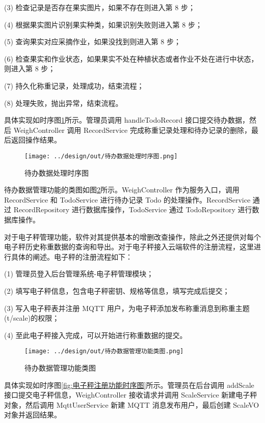 (3) 检查记录是否存在果实图片，如果不存在则进入第 8 步；

(4) 根据果实图片识别果实种类，如果识别失败则进入第 8 步；

(5) 查询果实对应采摘作业，如果没找到则进入第 8 步；

(6) 检查果实和作业状态，如果果实不处在种植状态或者作业不处在进行中状态，则进入第 8 步；

(7) 持久化称重记录，处理成功，结束流程；

(8) 处理失败，抛出异常，结束流程。

具体实现如时序图\ref{fig:待办数据处理时序图}所示。管理员调用 handleTodoRecord 接口提交待办数据，然后 WeighController 调用 RecordService 完成称重记录处理和待办记录的删除，最后返回操作结果。

\begin{figure}
    \centering
    \texttt{[image: ../design/out/待办数据处理时序图.png]}
    \caption{待办数据处理时序图}
    \label{fig:待办数据处理时序图}
\end{figure}

待办数据管理功能的类图如图\ref{fig:待办数据管理功能类图}所示。WeighController 作为服务入口，调用 RecordService 和 TodoService 进行待办记录 Todo 的处理操作。RecordService 通过 RecordRepository 进行数据库操作，TodoService 通过 TodoRepository 进行数据库操作。

对于电子秤管理功能，软件对其提供基本的增删改查操作，除此之外还提供对每个电子秤历史称重数据的查询和导出。对于电子秤接入云端软件的注册流程，这里进行具体的阐述。电子秤的注册流程如下：

(1) 管理员登入后台管理系统-电子秤管理模块；

(2) 填写电子秤信息，包含电子秤密钥、规格等信息，填写完成后提交；

(3) 写入电子秤表并注册 MQTT 用户，为电子秤添加发布称重消息到称重主题(t/scale)的权限；

(4) 至此电子秤接入完成，可以开始进行称重数据的提交。

\begin{figure}
    \centering
    \texttt{[image: ../design/out/待办数据管理功能类图.png]}
    \caption{待办数据管理功能类图}
    \label{fig:待办数据管理功能类图}
\end{figure}

具体实现如时序图\ref{fig:电子秤注册功能时序图}所示。管理员在后台调用 addScale 接口提交电子秤信息，WeighController 接收请求并调用 ScaleService 新建电子秤对象，然后调用 MqttUserService 新建 MQTT 消息发布用户，最后创建 ScaleVO 对象并返回结果。

